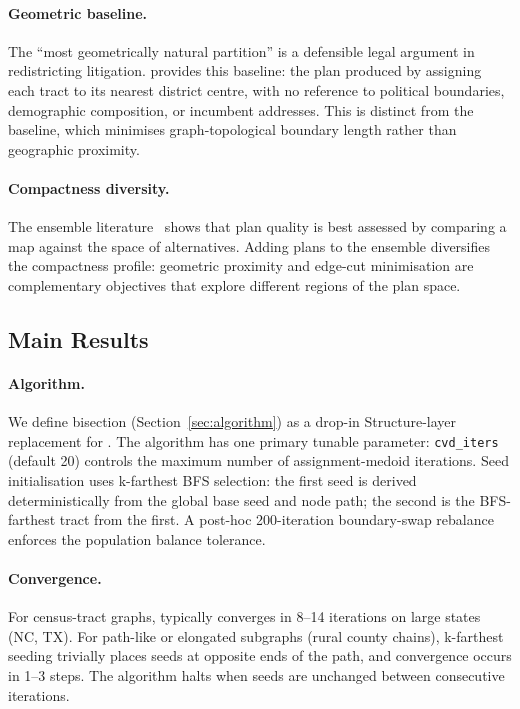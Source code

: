 \paragraph{Geometric baseline.}
The ``most geometrically natural partition'' is a defensible legal argument
in redistricting litigation.
\cvd{} provides this baseline: the plan produced by assigning each tract to
its nearest district centre, with no reference to political boundaries,
demographic composition, or incumbent addresses.
This is distinct from the \metis{} baseline, which minimises graph-topological
boundary length rather than geographic proximity.

\paragraph{Compactness diversity.}
The ensemble literature~\citep{deford2021} shows that plan quality is best
assessed by comparing a map against the space of alternatives.
Adding \cvd{} plans to the ensemble diversifies the compactness profile:
geometric proximity and edge-cut minimisation are complementary objectives
that explore different regions of the plan space.

\subsection{Main Results}

\paragraph{Algorithm.}
We define \cvd{} bisection (Section~\ref{sec:algorithm}) as a drop-in
Structure-layer replacement for \metis{}.
The algorithm has one primary tunable parameter:
\texttt{cvd\_iters} (default 20) controls the maximum number of
assignment-medoid iterations.
Seed initialisation uses k-farthest BFS selection: the first seed is derived
deterministically from the global base seed and node path; the second is the
BFS-farthest tract from the first.
A post-hoc 200-iteration boundary-swap rebalance enforces the population
balance tolerance.

\paragraph{Convergence.}
For census-tract graphs, \cvd{} typically converges in 8--14 iterations on
large states (NC, TX).
For path-like or elongated subgraphs (rural county chains), k-farthest seeding
trivially places seeds at opposite ends of the path, and convergence occurs in
1--3 steps.
The algorithm halts when seeds are unchanged between consecutive iterations.

